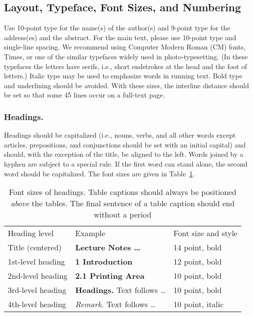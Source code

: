 \documentclass[a4paper]{llncs}
\begin{document}
\subsection{Layout, Typeface, Font Sizes, and Numbering}
Use 10-point type for the name(s) of the author(s) and 9-point type for
the address(es) and the abstract. For the main text, please use 10-point
type and single-line spacing.
We recommend using Computer Modern Roman (CM) fonts, Times, or one
of the similar typefaces widely used in photo-typesetting.
(In these typefaces the letters have serifs, i.e., short endstrokes at
the head and the foot of letters.)
Italic type may be used to emphasize words in running text. Bold
type and underlining should be avoided.
With these sizes, the interline distance should be set so that some 45
lines occur on a full-text page.

\subsubsection{Headings.}

Headings should be capitalized
(i.e., nouns, verbs, and all other words
except articles, prepositions, and conjunctions should be set with an
initial capital) and should,
with the exception of the title, be aligned to the left.
Words joined by a hyphen are subject to a special rule. If the first
word can stand alone, the second word should be capitalized.
The font sizes
are given in Table~\ref{table:headings}.
\setlength{\tabcolsep}{4pt}
\begin{table}
\begin{center}
\caption{Font sizes of headings. Table captions should always be
positioned {\it above} the tables. The final sentence of a table
caption should end without a period}
\label{table:headings}
\begin{tabular}{lll}
\hline\noalign{\smallskip}
Heading level & Example & Font size and style\\
\noalign{\smallskip}
\hline
\noalign{\smallskip}
Title (centered)  & {\Large \bf Lecture Notes \dots} & 14 point, bold\\
1st-level heading & {\large \bf 1 Introduction} & 12 point, bold\\
2nd-level heading & {\bf 2.1 Printing Area} & 10 point, bold\\
3rd-level heading & {\bf Headings.} Text follows \dots & 10 point, bold
\\
4th-level heading & {\it Remark.} Text follows \dots & 10 point,
italic\\
\hline
\end{tabular}
\end{center}
\end{table}
\setlength{\tabcolsep}{1.4pt}
\end{document}
